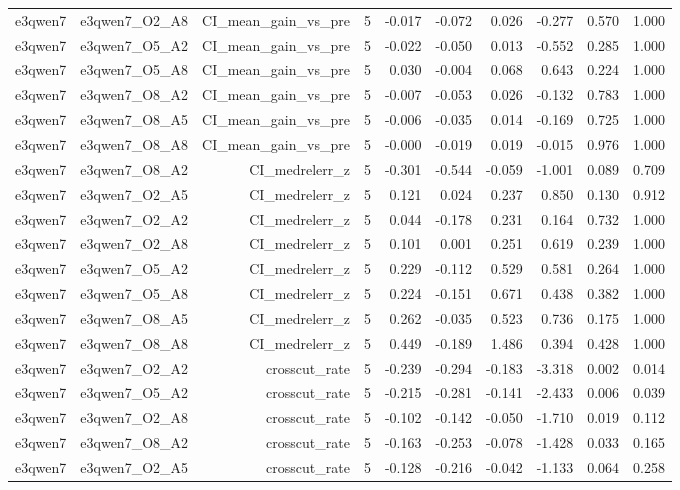 \documentclass[11pt]{article}
\begin{document}
\begin{landscape}
\begin{longtable}{@{}lrrrrrrrrr@{}}
e3qwen7 & e3qwen7\_O2\_A8 & CI\_mean\_gain\_vs\_pre & 5 & -0.017 & -0.072 & 0.026 & -0.277 & 0.570 & 1.000 \\
e3qwen7 & e3qwen7\_O5\_A2 & CI\_mean\_gain\_vs\_pre & 5 & -0.022 & -0.050 & 0.013 & -0.552 & 0.285 & 1.000 \\
e3qwen7 & e3qwen7\_O5\_A8 & CI\_mean\_gain\_vs\_pre & 5 & 0.030 & -0.004 & 0.068 & 0.643 & 0.224 & 1.000 \\
e3qwen7 & e3qwen7\_O8\_A2 & CI\_mean\_gain\_vs\_pre & 5 & -0.007 & -0.053 & 0.026 & -0.132 & 0.783 & 1.000 \\
e3qwen7 & e3qwen7\_O8\_A5 & CI\_mean\_gain\_vs\_pre & 5 & -0.006 & -0.035 & 0.014 & -0.169 & 0.725 & 1.000 \\
e3qwen7 & e3qwen7\_O8\_A8 & CI\_mean\_gain\_vs\_pre & 5 & -0.000 & -0.019 & 0.019 & -0.015 & 0.976 & 1.000 \\
e3qwen7 & e3qwen7\_O8\_A2 & CI\_medrelerr\_z & 5 & -0.301 & -0.544 & -0.059 & -1.001 & 0.089 & 0.709 \\
e3qwen7 & e3qwen7\_O2\_A5 & CI\_medrelerr\_z & 5 & 0.121 & 0.024 & 0.237 & 0.850 & 0.130 & 0.912 \\
e3qwen7 & e3qwen7\_O2\_A2 & CI\_medrelerr\_z & 5 & 0.044 & -0.178 & 0.231 & 0.164 & 0.732 & 1.000 \\
e3qwen7 & e3qwen7\_O2\_A8 & CI\_medrelerr\_z & 5 & 0.101 & 0.001 & 0.251 & 0.619 & 0.239 & 1.000 \\
e3qwen7 & e3qwen7\_O5\_A2 & CI\_medrelerr\_z & 5 & 0.229 & -0.112 & 0.529 & 0.581 & 0.264 & 1.000 \\
e3qwen7 & e3qwen7\_O5\_A8 & CI\_medrelerr\_z & 5 & 0.224 & -0.151 & 0.671 & 0.438 & 0.382 & 1.000 \\
e3qwen7 & e3qwen7\_O8\_A5 & CI\_medrelerr\_z & 5 & 0.262 & -0.035 & 0.523 & 0.736 & 0.175 & 1.000 \\
e3qwen7 & e3qwen7\_O8\_A8 & CI\_medrelerr\_z & 5 & 0.449 & -0.189 & 1.486 & 0.394 & 0.428 & 1.000 \\
e3qwen7 & e3qwen7\_O2\_A2 & crosscut\_rate & 5 & -0.239 & -0.294 & -0.183 & -3.318 & 0.002 & 0.014 \\
e3qwen7 & e3qwen7\_O5\_A2 & crosscut\_rate & 5 & -0.215 & -0.281 & -0.141 & -2.433 & 0.006 & 0.039 \\
e3qwen7 & e3qwen7\_O2\_A8 & crosscut\_rate & 5 & -0.102 & -0.142 & -0.050 & -1.710 & 0.019 & 0.112 \\
e3qwen7 & e3qwen7\_O8\_A2 & crosscut\_rate & 5 & -0.163 & -0.253 & -0.078 & -1.428 & 0.033 & 0.165 \\
e3qwen7 & e3qwen7\_O2\_A5 & crosscut\_rate & 5 & -0.128 & -0.216 & -0.042 & -1.133 & 0.064 & 0.258 \\

\end{longtable}
\end{landscape}
\end{document}
